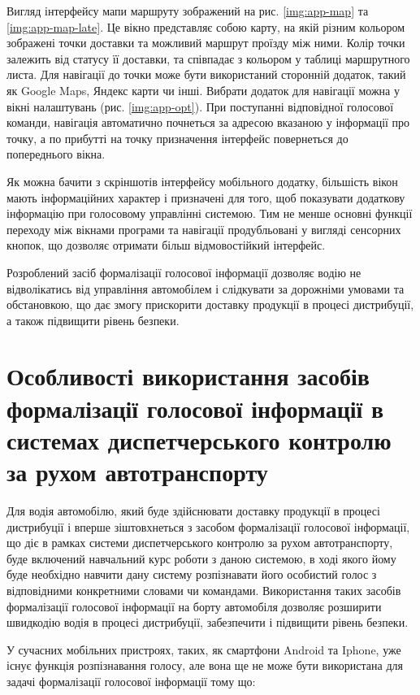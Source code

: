 Вигляд інтерфейсу мапи маршруту зображений на рис. \ref{img:app-map} та \ref{img:app-map-late}. Це вікно представляє собою карту, на якій різним кольором зображені точки доставки та можливий маршрут проїзду між ними. Колір точки залежить від статусу її доставки, та співпадає з кольором у таблиці маршрутного листа. Для навігації до точки може бути використаний сторонній додаток, такий як Google Maps, Яндекс карти чи інші. Вибрати додаток для навігації можна у вікні налаштувань (рис. \ref{img:app-opt}). При поступанні відповідної голосової команди, навігація автоматично почнеться за адресою вказаною у інформації про точку, а по прибутті на точку призначення інтерфейс повернеться до попереднього вікна.

Як можна бачити з скріншотів інтерфейсу мобільного додатку, більшість вікон мають інформаційних характер і призначені для того, щоб показувати додаткову інформацію при голосовому управлінні системою. Тим не менше основні функції переходу між вікнами програми та навігації продубльовані у вигляді сенсорних кнопок, що дозволяє отримати більш відмовостійкий інтерфейс.

Розроблений засіб формалізації голосової інформації дозволяє водію не відволікатись від управління автомобілем і слідкувати за дорожніми умовами та обстановкою, що дає змогу прискорити доставку продукції в процесі дистрибуції, а також підвищити рівень безпеки.

\section{Особливості використання засобів формалізації голосової інформації в системах диспетчерського контролю за рухом автотранспорту} \label{sect4_1}

Для водія автомобілю, який буде здійснювати доставку продукції в процесі дистрибуції і вперше зіштовхнеться з засобом формалізації голосової інформації, що діє в рамках системи диспетчерського контролю за рухом автотранспорту, буде включений навчальний курс роботи з даною системою, в ході якого йому буде необхідно навчити дану систему розпізнавати його особистий голос з відповідними конкретними словами чи командами. Використання таких засобів формалізації голосової інформації на борту автомобіля дозволяє розширити швидкодію водія в процесі дистрибуції, забезпечити і підвищити рівень безпеки.

У сучасних мобільних пристроях, таких, як смартфони Android та Iphone, уже існує функція розпізнавання голосу, але вона ще не може бути використана для задачі формалізації голосової інформації тому що:

